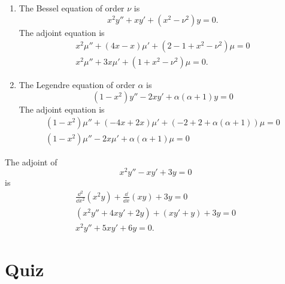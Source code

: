 {%
\begin{Solution}
  \label{solution adjoint x2yxyx2nu2y=0}
  \begin{enumerate}
  \item
    The Bessel equation of order $\nu$ is
    \[
    x^2 y'' + x y' + (x^2 - \nu^2) y = 0.
    \]
    The adjoint equation is
    \begin{gather*}
      x^2 \mu'' + (4 x - x) \mu' + (2 - 1 + x^2 - \nu^2) \mu = 0 \\
      \boxed{
        x^2 \mu'' + 3 x \mu' + (1 + x^2 - \nu^2) \mu = 0.
        }
    \end{gather*}
  \item
    The Legendre equation of order $\alpha$ is
    \[
    (1-x^2) y'' - 2 x y' + \alpha (\alpha+1) y = 0
    \]
    The adjoint equation is
    \begin{gather*}
      (1-x^2) \mu'' + (-4x + 2 x) \mu' + (-2 + 2 + \alpha (\alpha+1) ) \mu = 0 \\
      \boxed{
        (1-x^2) \mu''  - 2 x \mu' + \alpha (\alpha+1) \mu = 0 
        }
    \end{gather*}
  \end{enumerate}
\end{Solution}







\begin{Solution}
  \label{solution adjoint x2yxy3y=0}
  The adjoint of 
  \[ 
  x^2 y'' - x y' + 3 y = 0 
  \]
  is
  \begin{gather*}
    \frac{\dd^2}{\dd x^2}(x^2 y) + \frac{\dd}{\dd x}(x y) + 3 y = 0 \\
    (x^2 y'' + 4x y' + 2y) + (x y' + y) + 3y = 0 \\
    \boxed{ 
      x^2 y'' + 5x y' + 6 y = 0. 
      }
  \end{gather*}
\end{Solution}





}


\raggedbottom
\pagebreak
\flushbottom
\section{Quiz}


